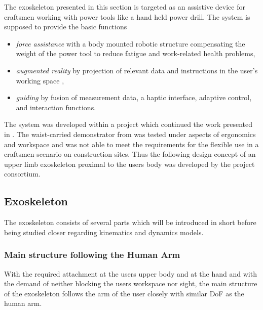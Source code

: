 \documentclass[letterpaper, 10 pt, conference]{ieeeconf}  %
\begin{document}
The exoskeleton presented in this section is targeted as an assistive device for craftsmen working with power tools like a hand held power drill.
The system is supposed to provide the basic functions
%
\begin{itemize}
    \item \emph{force assistance} with a body mounted robotic structure compensating the weight of the power tool to reduce fatigue and work-related health problems,
    \item \emph{augmented reality} by projection of relevant data and instructions in the user's working space \cite{NuelleBriTapDem2018},
    \item \emph{guiding} by fusion of measurement data, a haptic interface, adaptive control, and interaction functions.
\end{itemize}
%
%
%
The system was developed within a project \cite{NuelleSchTapLil2017} which continued the work presented in \cite{PetereitAlbJerSch2012}. 
The waist-carried demonstrator from \cite{PetereitAlbJerSch2012} was tested under aspects of ergonomics and workspace and was not able to meet the requirements for the flexible use in a  craftsmen-scenario on construction sites. Thus the following design concept of an upper limb exoskeleton proximal to the users body was developed by the project consortium.

\subsection{Exoskeleton}

The exoskeleton consists of several parts which will be introduced in short before being studied closer regarding kinematics and dynamics models.

\subsubsection{Main structure following the Human Arm}

With the required attachment at the users upper body and at the hand and with the demand of neither blocking the users workspace nor sight, the main structure of the exoskeleton follows the arm of the user closely with similar DoF as the human arm.
\end{document}
